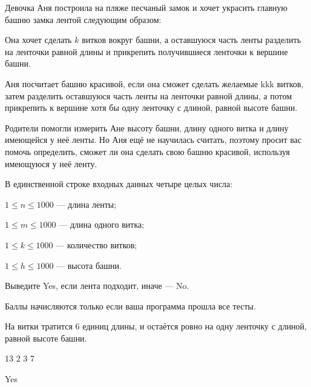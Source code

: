 
Девочка Аня построила на пляже песчаный замок и хочет украсить главную башню замка лентой следующим образом:

Она хочет сделать $k$ витков вокруг башни, а оставшуюся часть ленты разделить на ленточки равной длины и прикрепить получившиеся ленточки к вершине башни. 

Аня посчитает башню красивой, если она сможет сделать желаемые kkk витков, затем разделить
оставшуюся часть ленты на ленточки равной длины, а потом прикрепить к вершине хотя бы одну 
ленточку с длиной, равной высоте башни.

Родители помогли измерить Ане высоту башни, длину одного витка и длину имеющейся у неё ленты. Но Аня ещё не научилась считать, поэтому просит вас помочь определить, сможет ли она сделать свою башню красивой, используя имеющуюся у неё ленту.


В единственной строке входных данных четыре целых числа:

$1 \le n \le 1000$ — длина ленты;

$1 \le m \le 1000$ — длина одного витка;

$1 \le k \le 1000$ — количество витков;

$1 \le h \le 1000$ — высота башни.

\outputfmtSection

Выведите Yes, если лента подходит, иначе — No.

\markSection

Баллы начисляются только если ваша программа прошла все тесты.

\explaneSection

На витки тратится $6$ единиц длины, и остаётся ровно на одну ленточку с длиной, равной высоте башни.


\begin{myverbbox}[\small]{\vinput}
    13 2 3 7
\end{myverbbox}
\begin{myverbbox}[\small]{\voutput}
    Yes
\end{myverbbox}

